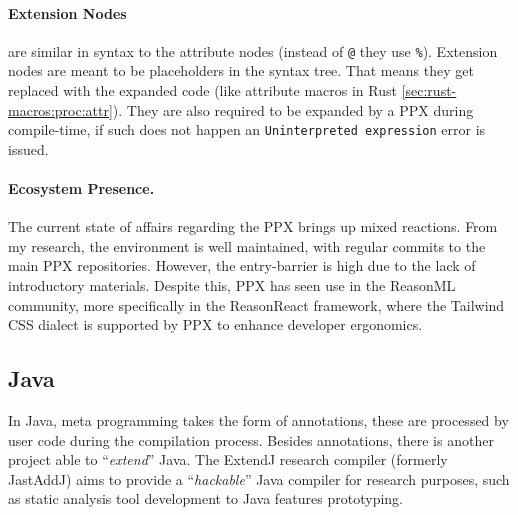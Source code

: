 \paragraph{Extension Nodes} are similar in syntax to the attribute nodes (instead of \texttt{@} they use \texttt{\%}).
Extension nodes are meant to be placeholders in the syntax tree.
That means they get replaced with the expanded code (like attribute macros in Rust \autoref{sec:rust-macros:proc:attr}).
They are also required to be expanded by a PPX during compile-time,
if such does not happen an \texttt{Uninterpreted expression} error is issued.

\begin{displayquote}
	\begin{compactitem}
		\item \texttt{[%
		\item \texttt{[%
	\end{compactitem}
\end{displayquote}

\paragraph{Ecosystem Presence.}
The current state of affairs regarding the PPX brings up mixed reactions.
From my research, the environment is well maintained, with regular commits to the main PPX repositories.
However, the entry-barrier is high due to the lack of introductory materials.
Despite this, PPX has seen use in the ReasonML community, more specifically in the ReasonReact framework,
where the Tailwind CSS dialect is supported by PPX to enhance developer ergonomics.

\subsection{Java}\label{sec:lang-preprocessors:java}

In Java, meta programming takes the form of annotations, these are processed by user code during the compilation process.
Besides annotations, there is another project able to “\emph{extend}” Java.
The ExtendJ research compiler (formerly JastAddJ) \autocite{Ekman2007} aims to provide a “\emph{hackable}” Java compiler for research purposes,
such as static analysis tool development to Java features prototyping.

